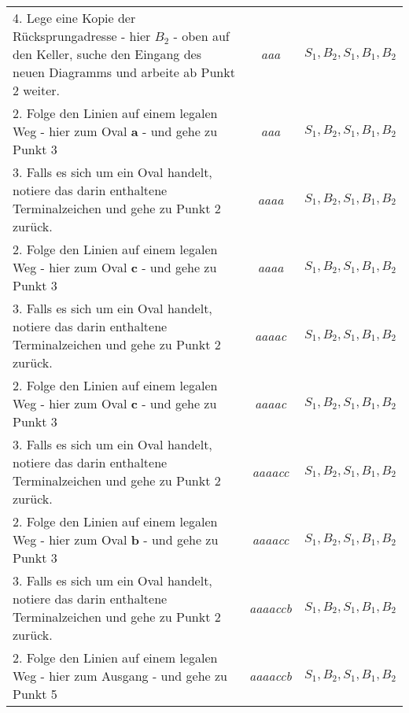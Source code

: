 \documentclass{scrreprt}
\begin{document}
\begin{enumerate}[(a)]
\begin{small}
\begin{tabularx}{\linewidth}{X|c|c}
    4. Lege eine Kopie der Rücksprungadresse - hier $B_2$ - oben auf den Keller,
    suche den Eingang des neuen Diagramms und arbeite ab Punkt 2 weiter.
    & \emph{aaa} & $S_1, B_2, S_1, B_1, B_2$ \\
    2. Folge den Linien auf einem legalen Weg - hier zum Oval \textbf{a} - und
    gehe zu Punkt 3 & \emph{aaa} & $S_1, B_2, S_1, B_1, B_2$ \\
    3. Falls es sich um ein Oval handelt, notiere das darin enthaltene
    Terminalzeichen und gehe zu Punkt 2 zurück.
    & \emph{aaaa} & $S_1, B_2, S_1, B_1, B_2$ \\
    2. Folge den Linien auf einem legalen Weg - hier zum Oval \textbf{c} - und
    gehe zu Punkt 3 & \emph{aaaa} & $S_1, B_2, S_1, B_1, B_2$ \\
    3. Falls es sich um ein Oval handelt, notiere das darin enthaltene
    Terminalzeichen und gehe zu Punkt 2 zurück.
    & \emph{aaaac} & $S_1, B_2, S_1, B_1, B_2$ \\
    2. Folge den Linien auf einem legalen Weg - hier zum Oval \textbf{c} - und
    gehe zu Punkt 3 & \emph{aaaac} & $S_1, B_2, S_1, B_1, B_2$ \\
    3. Falls es sich um ein Oval handelt, notiere das darin enthaltene
    Terminalzeichen und gehe zu Punkt 2 zurück.
    & \emph{aaaacc} & $S_1, B_2, S_1, B_1, B_2$ \\
    2. Folge den Linien auf einem legalen Weg - hier zum Oval \textbf{b} - und
    gehe zu Punkt 3 & \emph{aaaacc} & $S_1, B_2, S_1, B_1, B_2$ \\
    3. Falls es sich um ein Oval handelt, notiere das darin enthaltene
    Terminalzeichen und gehe zu Punkt 2 zurück.
    & \emph{aaaaccb} & $S_1, B_2, S_1, B_1, B_2$ \\
    2. Folge den Linien auf einem legalen Weg - hier zum Ausgang - und
    gehe zu Punkt 5 & \emph{aaaaccb} & $S_1, B_2, S_1, B_1, B_2$ \\
  \end{tabularx}
  \end{small}


\end{enumerate}
\end{document}
